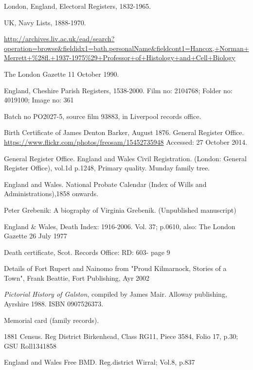 \begin{thebibliography}{99}
	 London, England, Electoral Registers, 1832-1965. 
	 
	 UK, Navy Lists, 1888-1970.
	 
	\url{http://archives.liv.ac.uk/ead/search?operation=browse&fieldidx1=bath.personalName&fieldcont1=Hancox,+Norman+Merrett+\%28fl.+1937-1975\%29+Professor+of+Histology+and+Cell+Biology}

	The London Gazette 11 October 1990. 
	
	England, Cheshire Parish Registers, 1538-2000.
	Film no: 2104768; Folder no: 4019100; Image no: 361

	Batch no PO2027-5, source film 93883, in Liverpool records office.

	Birth Certificate of James Denton Barker, August 1876. General Register Office.
	\url{https://www.flickr.com/photos/freosam/15452735948}
	Accessed: 27 October 2014.

	General Register Office. England and Wales Civil Registration. (London: General Register Office), vol.1d p.1248, Primary quality.
	Munday family tree. 

	England and Wales. National Probate Calendar (Index of Wills and Administrations),1858 onwards. 

	Peter Grebenik: A biography of Virginia Grebenik. (Unpublished manuscript)

	England \& Wales, Death Index: 1916-2006. Vol. 37; p.0610, also:
	The London Gazette 26 July 1977

	Death certificate, Scot. Records Office: RD: 603- page 9

	Details of Fort Rupert and Nainomo from "Proud Kilmarnock, Stories of a Town", Frank Beattie, Fort Publishing, Ayr 2002

	\emph{Pictorial History of Galston}, compiled by James Mair. Alloway publishing, Ayrshire 1988. ISBN 0907526373.

	 Memorial card (family records).
	 
	1881 Census. Reg District Birkenhead, Class RG11, Piece 3584, Folio 17, p.30; GSU Roll1341858
	
	England and Wales Free BMD. Reg.district Wirral; Vol.8, p.837
	

\end{thebibliography}
